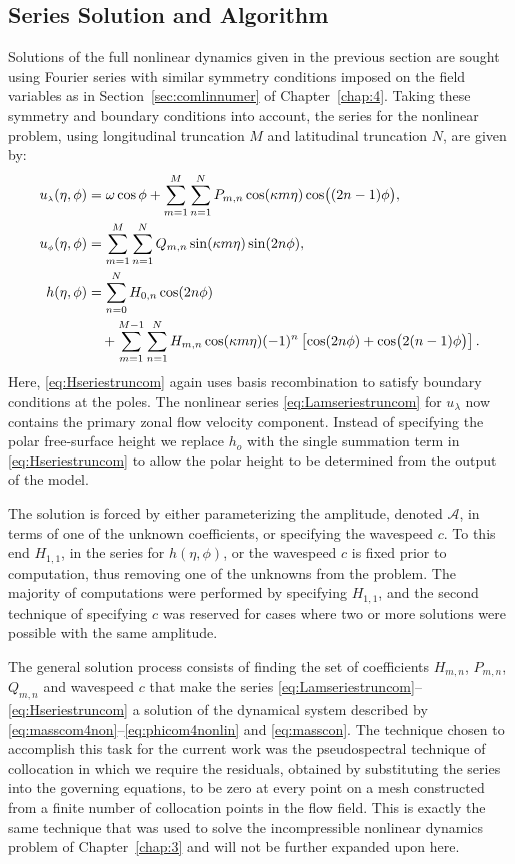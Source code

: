 \subsection{Series Solution and Algorithm}
\label{subsec:serandalg}
Solutions of the full nonlinear dynamics given in the previous section are sought using Fourier series with similar symmetry conditions imposed on the field variables as in Section~\ref{sec:comlinnumer} of Chapter~\ref{chap:4}. Taking these symmetry and boundary conditions into account, the series for the nonlinear problem, using longitudinal truncation $M$ and latitudinal truncation $N$, are given by:
\begin{align}
{\ensuremath{u_{\scriptscriptstyle \lambda}}}(\eta,\phi) &= \omega\cos\phi+\sum_{m=1}^M \sum_{n=1}^N P_{m,n}\cos(\kappa m \eta) \cos\bigl((2n-1)\phi\bigr), \label{eq:Lamseriestruncom}\\
{u_{\scriptscriptstyle \phi}}(\eta,\phi) &= \sum_{m=1}^M \sum_{n=1}^N Q_{m,n}\sin(\kappa m \eta) \sin(2n\phi), \label{eq:Phiseriestruncom}\\
h(\eta,\phi) &= \sum_{n=0}^N H_{0,n}\cos(2 n \phi) \notag \\
&\quad+\sum_{m=1}^{M-1} \sum_{n=1}^N H_{m,n} \cos(\kappa m \eta) (-1)^n \left[ \cos(2n\phi)+\cos\bigl(2(n-1)\phi\bigr) \right]. \label{eq:Hseriestruncom}
\end{align}
Here, \eqref{eq:Hseriestruncom} again uses basis recombination to satisfy boundary conditions at the poles. The nonlinear series \eqref{eq:Lamseriestruncom} for $u_{\lambda}$ now contains the primary zonal flow velocity component. Instead of specifying the polar free-surface height we replace $h_o$ with the single summation term in \eqref{eq:Hseriestruncom} to allow the polar height to be determined from the output of the model.

The solution is forced by either parameterizing the amplitude, denoted $\mathcal{A}$, in terms of one of the unknown coefficients, or specifying the wavespeed $c$. To this end $H_{1,1}$, in the series for $h(\eta,\phi)$, or the wavespeed $c$ is fixed prior to computation, thus removing one of the unknowns from the problem. The majority of computations were performed by specifying $H_{1,1}$, and the second technique of specifying $c$ was reserved for cases where two or more solutions were possible with the same amplitude.

The general solution process consists of finding the set of coefficients $H_{m,n}$, $P_{m,n}$, $Q_{m,n}$ and wavespeed $c$ that make the series \eqref{eq:Lamseriestruncom}--\eqref{eq:Hseriestruncom} a solution of the dynamical system described by \eqref{eq:masscom4non}--\eqref{eq:phicom4nonlin} and \eqref{eq:masscon}. The technique chosen to accomplish this task for the current work was the pseudospectral technique of collocation in which we require the residuals, obtained by substituting the series into the governing equations, to be zero at every point on a mesh constructed from a finite number of collocation points in the flow field. This is exactly the same technique that was used to solve the incompressible nonlinear dynamics problem of Chapter~\ref{chap:3} and will not be further expanded upon here.


